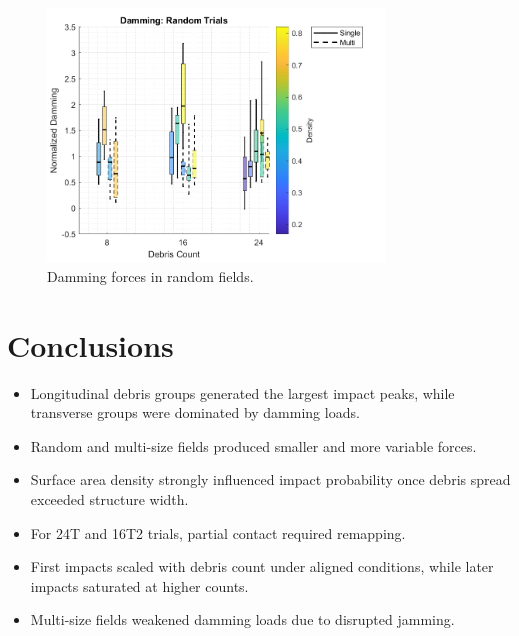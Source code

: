 \documentclass{article}
\begin{document}
\begin{figure}[htbp]
    \centering
    \includegraphics[width=0.8\textwidth]{Damming_Random_Single_vs_Multi_ByDensityGradient.png}
    \caption{Damming forces in random fields.}
    \label{fig:damming_random}
\end{figure}


\section{Conclusions}
\begin{itemize}
    \item Longitudinal debris groups generated the largest impact peaks, while transverse groups were dominated by damming loads.
    \item Random and multi-size fields produced smaller and more variable forces.
    \item Surface area density strongly influenced impact probability once debris spread exceeded structure width.
    \item For 24T and 16T2 trials, partial contact required remapping.
    \item First impacts scaled with debris count under aligned conditions, while later impacts saturated at higher counts.
    \item Multi-size fields weakened damming loads due to disrupted jamming.
\end{itemize}
\end{document}
